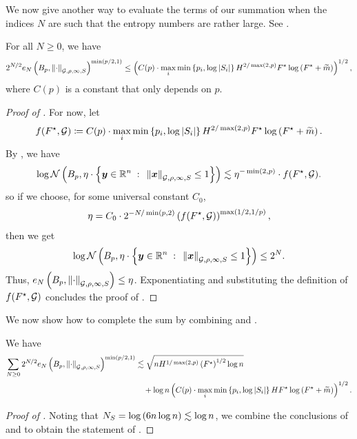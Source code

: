 \documentclass[11pt]{article}
\numberwithin{equation}{section}
\begin{document}
We now give another way to evaluate the terms of our summation when the indices $N$ are such that the entropy numbers are rather large. See .

\begin{lemma}
\label{lemma:concentration_g2_two_one_sudakov}
For all $N \ge 0$, we have
\begin{align*}
    2^{N/2}e_N\left(B_p, \left\lVert \cdot \right\rVert_{\mathcal{G},\rho,\infty, S}\right)^{\min(p/2,1)} \le \left(C(p) \cdot \max_i\min\left\{p_i,\log\left\lvert S_i \right\rvert\right\}H^{2/\max(2,p)}F^{\star}\log\left(F^{\star}+\widetilde{m}\right)\right)^{1/2},
\end{align*}
where $C(p)$ is a constant that only depends on $p$.
\end{lemma}
\begin{proof}[Proof of ]
For now, let
\begin{align*}
    f(F^{\star},\mathcal{G}) \coloneqq C(p) \cdot \max_i\min\left\{p_i,\log\left\lvert S_i \right\rvert\right\}H^{2/\max(2,p)}F^{\star}\log\left(F^{\star}+\widetilde{m}\right).
\end{align*}
By , we have
\begin{align*}
    \log \mathcal{N}\left(B_{p}, \eta \cdot \left\{\bm{y} \in \mathbb{R}^n {\;\; : \;\;} \left\lVert \bm{x} \right\rVert_{\mathcal{G},\rho,\infty, S} \le 1\right\}\right) \lesssim \eta^{-\min(2,p)} \cdot f(F^{\star},\mathcal{G}).
\end{align*}
so if we choose, for some universal constant $C_0$,
\begin{align*}
    \eta = C_0 \cdot 2^{-N/\min(p,2)}\left(f(F^{\star},\mathcal{G})\right)^{\max(1/2,1/p)},
\end{align*}
then we get
\begin{align*}
    \log \mathcal{N}\left(B_{p}, \eta \cdot \left\{\bm{y} \in \mathbb{R}^n {\;\; : \;\;} \left\lVert \bm{x} \right\rVert_{\mathcal{G},\rho,\infty, S} \le 1\right\}\right) \le 2^N.
\end{align*}
Thus, $e_N\left(B_p, \left\lVert \cdot \right\rVert_{\mathcal{G},\rho,\infty, S}\right) \le \eta$. Exponentiating and substituting the definition of $f(F^{\star},\mathcal{G})$ concludes the proof of .
\end{proof}

We now show how to complete the sum by combining  and .

\begin{lemma}
\label{lemma:concentration_subgaussian}
We have
\begin{align*}
    \sum_{N \ge 0} 2^{N/2}e_N\left(B_p, \left\lVert \cdot \right\rVert_{\mathcal{G},\rho,\infty, S}\right)^{\min(p/2,1)} &\lesssim \sqrt{nH^{1/\max(2,p)}\left(F^{\star}\right)^{1/2}\log n} \\
    &\quad +\log n\left(C(p) \cdot \max_i\min\left\{p_i,\log\left\lvert S_i \right\rvert\right\}HF^{\star}\log\left(F^{\star}+\widetilde{m}\right)\right)^{1/2}.
\end{align*}
\end{lemma}
\begin{proof}[Proof of ]
Noting that $N_S = \log\left(6n\log n\right) \lesssim \log n$, we combine the conclusions of  and  to obtain the statement of .
\end{proof}
\end{document}
